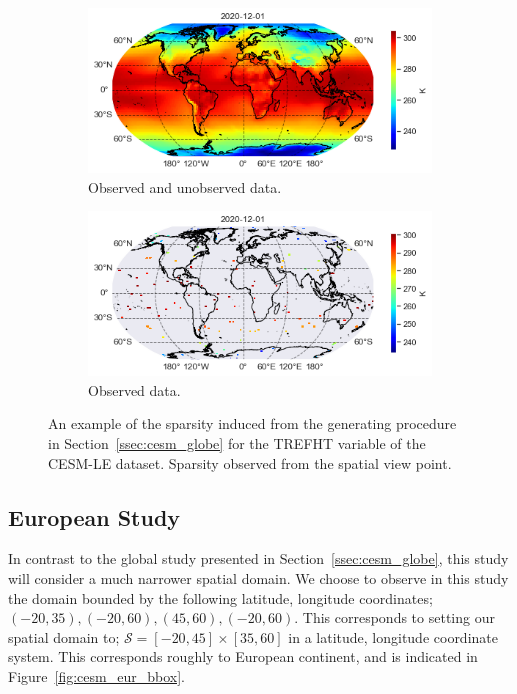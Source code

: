 \begin{figure}
	\centering
	\begin{subfigure}[b]{0.45\textwidth}
		\includegraphics[width=\textwidth]{globe_sparse_full}
		\caption{Observed and unobserved data.}
	\end{subfigure}
	\hfill        
	\begin{subfigure}[b]{0.45\textwidth}
		\includegraphics[width=\textwidth]{globe_sparse_train}
		\caption{Observed data.}
	\end{subfigure}
	\caption[An example of the sparsity induced from the  generating procedure in Section~\ref{ssec:cesm_globe} for the TREFHT variable of the CESM-LE dataset.]{An example of the sparsity induced from the  generating procedure in Section~\ref{ssec:cesm_globe} for the TREFHT variable of the CESM-LE dataset. Sparsity observed from the spatial view point.}
	\label{fig:cesm_sparsity}
\end{figure}

\subsection{European Study \label{ssec:cesm_eur}}
In contrast to the global study presented in Section~\ref{ssec:cesm_globe}, this study will consider a much narrower spatial domain.
We choose to observe in this study the domain bounded by the following latitude, longitude coordinates; $\left(-20, 35\right), \left(-20, 60\right), \left(45, 60\right), \left(-20, 60\right)$.
This corresponds to setting our spatial domain to; $\mathcal{S} = \left[-20, 45\right] \times \left[35, 60\right]$ in a latitude, longitude coordinate system.
This corresponds roughly to European continent, and is indicated in Figure~\ref{fig:cesm_eur_bbox}.


